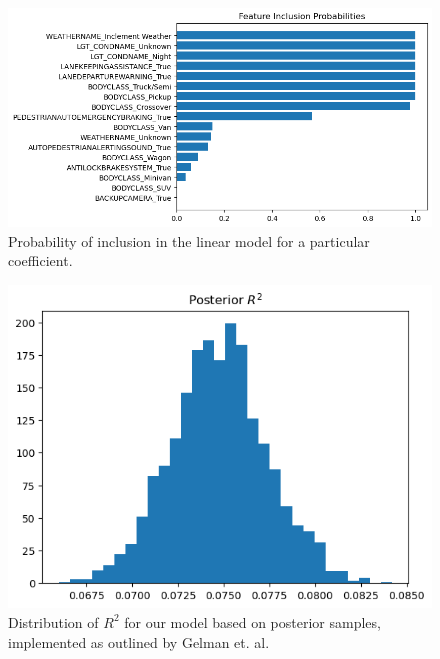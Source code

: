 \documentclass[12pt]{article}
\begin{document}
\begin{figure}[h]
    \centering
    \includegraphics[width=\textwidth]{images/inclusion_probs.png}
    \caption{Probability of inclusion in the linear model for a particular coefficient.}
    \label{fig:inclusion_probs}
\end{figure}

\begin{figure}[h]
    \centering
    \includegraphics[width=\textwidth]{images/R2_dist.png}
    \caption{Distribution of $R^2$ for our model based on posterior samples, implemented as outlined by Gelman et. al.}
    \label{fig:r2_dist}
\end{figure}
\end{document}
